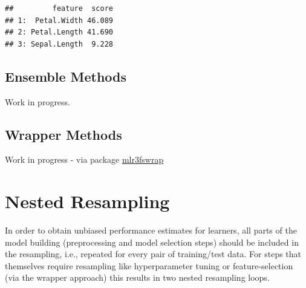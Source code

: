 \documentclass[]{scrbook}
\newenvironment{Shaded}{\begin{snugshade}}{\end{snugshade}}
\newcommand{\DataTypeTok}[1]{\textcolor[rgb]{0.13,0.29,0.53}{#1}}
\newcommand{\DecValTok}[1]{\textcolor[rgb]{0.00,0.00,0.81}{#1}}
\newcommand{\KeywordTok}[1]{\textcolor[rgb]{0.13,0.29,0.53}{\textbf{#1}}}
\newcommand{\NormalTok}[1]{#1}
\newcommand{\OperatorTok}[1]{\textcolor[rgb]{0.81,0.36,0.00}{\textbf{#1}}}
\newcommand{\StringTok}[1]{\textcolor[rgb]{0.31,0.60,0.02}{#1}}
\renewenvironment{Shaded} {\begin{snugshade}\small} {\end{snugshade}}
\begin{document}
\begin{Shaded}
\end{Shaded}

\begin{verbatim}
##         feature  score
## 1:  Petal.Width 46.089
## 2: Petal.Length 41.690
## 3: Sepal.Length  9.228
\end{verbatim}

\hypertarget{fs-ensemble}{%
\subsection{Ensemble Methods}\label{fs-ensemble}}

Work in progress.

\hypertarget{fs-wrapper}{%
\subsection{Wrapper Methods}\label{fs-wrapper}}

Work in progress - via package \href{https://github.com/mlr-org/mlr3fswrap}{mlr3fswrap}

\hypertarget{nested-resampling}{%
\section{Nested Resampling}\label{nested-resampling}}

In order to obtain unbiased performance estimates for learners, all parts of the model building (preprocessing and model selection steps) should be included in the resampling, i.e., repeated for every pair of training/test data.
For steps that themselves require resampling like hyperparameter tuning or feature-selection (via the wrapper approach) this results in two nested resampling loops.
\end{document}
